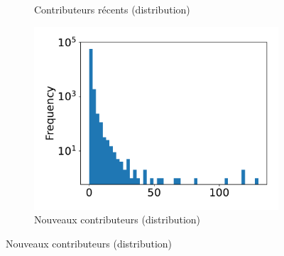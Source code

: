 \documentclass[dvipsnames,runningheads]{llncs}
\begin{document}
\begin{figure}[ht]
\begin{subfigure}[t]{0.333\textwidth}
            \caption{Contributeurs récents (distribution)}
        \end{subfigure}%
        \begin{subfigure}[t]{0.333\textwidth}
            \includegraphics[width=\textwidth]{../experiment/data_analysis/newContributorCount_distribution}
            \caption{Nouveaux contributeurs (distribution)}
        \end{subfigure}


\end{figure}
\end{document}
